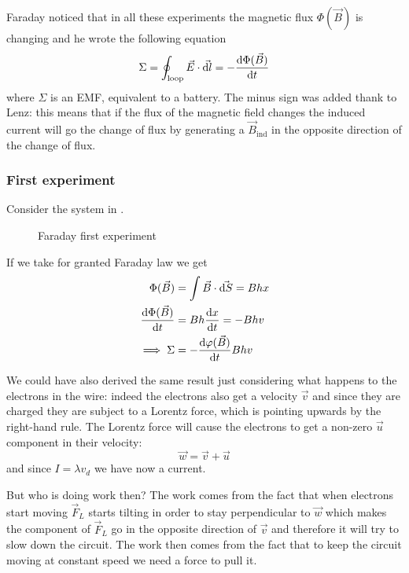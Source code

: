 \documentclass[12pt]{extarticle}
\begin{document}
Faraday noticed that in all these experiments the magnetic flux $\Phi(\vec B)$ is changing
and he wrote the following equation
\begin{equation}
    \Sigma = \oint_\text{loop} \vec E \cdot \vec{\dd l} = - \dv{\Phi(\vec B)}{t}
\end{equation}
where $\Sigma$ is an EMF, equivalent to a battery.
The minus sign was added thank to Lenz: this means that if the flux of the magnetic field changes
the induced current will go  the change of flux
by generating a $\vec B_\text{ind}$ in the opposite direction of the change of flux.

\subsubsection{First experiment}
Consider the system in .

\begin{figure}[H]
    \centering
    
    \caption{Faraday first experiment}
    \label{fig:faraday-exp-1}
\end{figure}

If we take for granted Faraday law we get
\begin{align}
    \Phi(\vec B)         & = \int \vec B \cdot \vec{\dd S} = B h x \\
    \dv{\Phi(\vec B)}{t} & = B h \dv{x}{t} = - B h v               \\
    \implies \Sigma      & = - \dv{\varphi(\vec B)}{t} B h v
\end{align}

We could have also derived the same result just considering what happens to the electrons in the wire:
indeed the electrons also get a velocity $\vec v$ and since they are charged they are subject to a Lorentz
force, which is pointing upwards by the right-hand rule.
The Lorentz force will cause the electrons to get a non-zero $\vec u$ component in their velocity:
\begin{equation}
    \vec w = \vec v + \vec u
\end{equation}
and since $I = \lambda v_d$ we have now a current.

But who is doing work then?
The work comes from the fact that when electrons start moving $\vec F_L$ starts tilting in order to stay
perpendicular to $\vec w$ which makes the component of $\vec F_L$ go in the opposite direction of $\vec v$
and therefore it will try to slow down the circuit.
The work then comes from the fact that to keep the circuit moving at constant speed we need a force to pull it.
\end{document}

